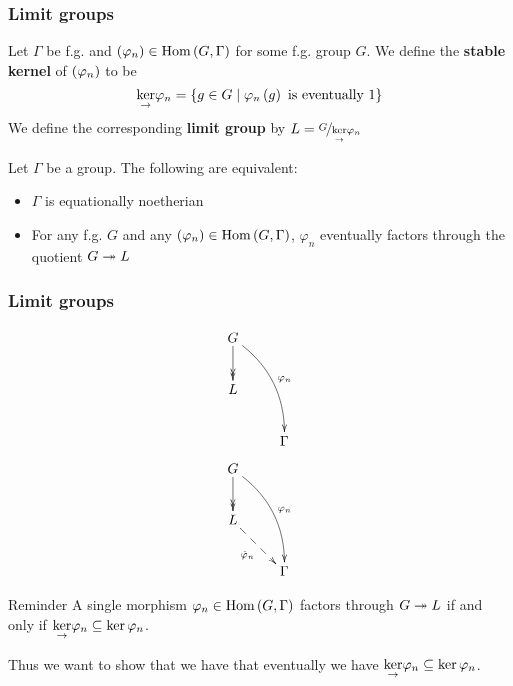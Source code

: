 \documentclass{beamer}[10]
\renewcommand{\hom}{\text{Hom}}
\begin{document}
\begin{frame}
    \frametitle{Limit groups}
    \pause 
    \begin{definition}\pause
        Let $\Gamma$ be f.g. and $\rb{\varphi_n} \in \hom\rb{G,\Gamma}$ for some f.g. group $G$. \pause
        We define the \textbf{stable kernel} of $\left( \varphi_n \right)$ to be
        \begin{equation*}
            \underset{\rightarrow}{\ker}{\varphi_n} = \left\{ g\in G \mid \varphi_n \left( g \right) \text{  is eventually } 1 \right\}
        \end{equation*}\pause
        We define the corresponding \textbf{limit group} by $L=\nicefrac{G}{\underset{\rightarrow}{\ker}{\varphi_n}}$
    \end{definition}
    \pause
    \begin{lemma}\pause
        Let $\Gamma$ be a group. The following are equivalent:\pause

        \begin{itemize}
            \item $\Gamma$ is equationally noetherian
            \pause \item For any f.g. $G$ and any $\rb{\varphi_n} \in \hom\rb{G,\Gamma}$, \pause $\varphi_n$ eventually factors through the
            quotient $G\twoheadrightarrow L$
        \end{itemize}

    \end{lemma}
\end{frame}

\begin{frame}
    \frametitle{Limit groups}
    \begin{overprint}
            \begin{equation*}
                \xymatrix{
                    G\ar@/^12pt/[ddr]^{\varphi_n} \ar@{->>}[d] &  \\
                    L &  \\
                    & \Gamma
                }
            \end{equation*}
            \begin{equation*}
                \xymatrix{
                    G\ar@/^12pt/[ddr]^{\varphi_n} \ar@{->>}[d] &  \\
                    L\ar@{-->}[dr]_{\hat{\varphi}_n} &  \\
                    & \Gamma
                }
            \end{equation*}
    \end{overprint}\pause\pause\pause 
    \begin{block}{Reminder}
        A single morphism $\varphi_n \in \hom\rb{G,\Gamma}$ factors through $G\twoheadrightarrow L$ if and only if $\underset{\rightarrow}{\ker}\varphi_n \subseteq \ker \varphi_n $. \pause
        
        Thus we want to show that we have that eventually we have $\underset{\rightarrow}{\ker}\varphi_n \subseteq \ker \varphi_n $.
    \end{block}
\end{frame}
\end{document}
